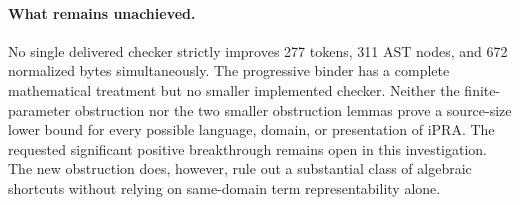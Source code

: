\paragraph{What remains unachieved.}
No single delivered checker strictly improves 277 tokens, 311 AST
nodes, and 672 normalized bytes simultaneously. The progressive
binder has a complete mathematical treatment but no smaller
implemented checker. Neither the finite-parameter obstruction nor
the two smaller obstruction lemmas prove a source-size lower bound
for every possible language, domain, or presentation of iPRA.
The requested significant positive breakthrough remains open in
this investigation. The new obstruction does, however, rule out
a substantial class of algebraic shortcuts without relying on
same-domain term representability alone.
